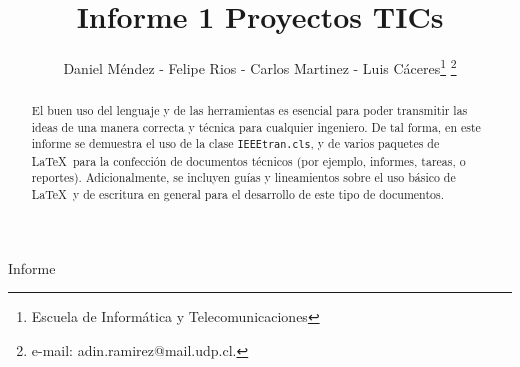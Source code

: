 \documentclass[twocolumn,11pts]{IEEEtran}
\begin{document}
\let\orilabel\label

%
\title{Informe 1 Proyectos TICs}
%

\author{Daniel Méndez - Felipe Rios - Carlos Martinez - Luis Cáceres\thanks{Escuela de Informática y Telecomunicaciones}%
\thanks{e-mail: adin.ramirez@mail.udp.cl.}%
}
% 
%


%
{Informe}%

\maketitle


\begin{abstract}
El buen uso del lenguaje y de las herramientas es esencial para poder transmitir las ideas de una manera correcta y técnica para cualquier ingeniero. De tal forma, en este informe se demuestra el uso de la clase \texttt{IEEEtran.cls}, y de varios paquetes de \LaTeX\ para la confección de documentos técnicos (por ejemplo, informes, tareas, o reportes). Adicionalmente, se incluyen guías y lineamientos sobre el uso básico de \LaTeX\ y de escritura en general para el desarrollo de este tipo de documentos.
\end{abstract}
\end{document}

